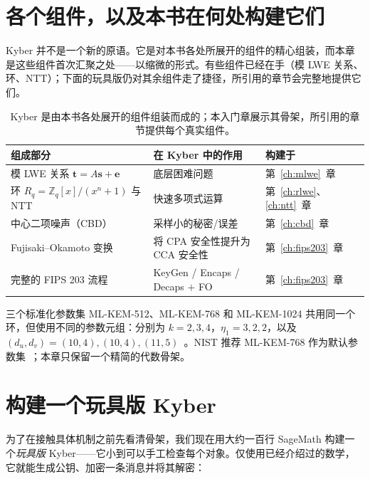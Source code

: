 \section{各个组件，以及本书在何处构建它们}

Kyber 并不是一个新的原语。它是对本书各处所展开的组件的精心组装，而本章是这些组件首次汇聚之处——以缩微的形式。有些组件已经在手（模 LWE 关系、环、NTT）；下面的玩具版仍对其余组件走了捷径，所引用的章节会完整地提供它们。

\begin{table}[H]
\centering
\small
\begin{tabular}{lll}
\toprule
组成部分 & 在 Kyber 中的作用 & 构建于 \\
\midrule
模 LWE 关系 $\mathbf{t}=A\mathbf{s}+\mathbf{e}$ & 底层困难问题 & 第~\ref{ch:mlwe}~章 \\
环 $R_q=\mathbb{Z}_q[x]/(x^n+1)$ 与 NTT & 快速多项式运算 & 第~\ref{ch:rlwe}、\ref{ch:ntt}~章 \\
中心二项噪声（CBD） & 采样小的秘密/误差 & 第~\ref{ch:cbd}~章 \\
Fujisaki–Okamoto 变换 & 将 CPA 安全性提升为 CCA 安全性 & 第~\ref{ch:fips203}~章 \\
完整的 FIPS 203 流程 & KeyGen / Encaps / Decaps $+$ FO & 第~\ref{ch:fips203}~章 \\
\bottomrule
\end{tabular}
\caption{Kyber 是由本书各处展开的组件组装而成的；本入门章展示其骨架，所引用的章节提供每个真实组件。}
\label{tab:kyber-pieces}
\end{table}

三个标准化参数集 ML-KEM-512、ML-KEM-768 和 ML-KEM-1024 共用同一个环，但使用不同的参数元组：分别为 $k=2,3,4$，$\eta_1=3,2,2$，以及 $(d_u,d_v)=(10,4),(10,4),(11,5)$~\cite{fips203}。NIST 推荐 ML-KEM-768 作为默认参数集~\cite{nistir8547}；本章只保留一个精简的代数骨架。

\section{构建一个玩具版 Kyber}

为了在接触具体机制之前先看清骨架，我们现在用大约一百行 SageMath 构建一个\emph{玩具版} Kyber——它小到可以手工检查每个对象。仅使用已经介绍过的数学，它就能生成公钥、加密一条消息并将其解密：

